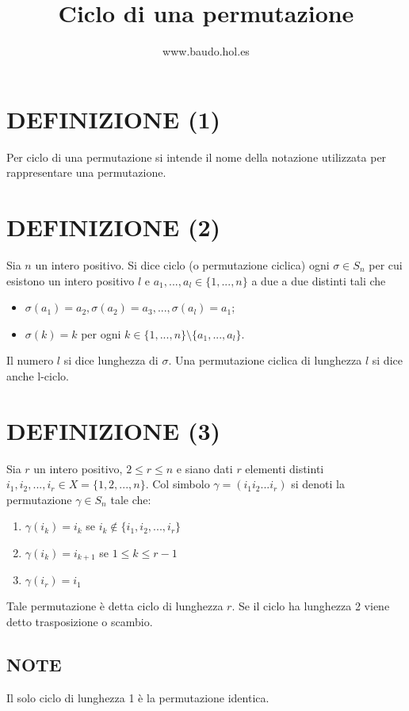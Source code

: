 \documentclass[a4paper,10pt]{article}
\title{Ciclo di una permutazione}
\author{www.baudo.hol.es}
\begin{document}
\maketitle

\section{DEFINIZIONE (1)}
Per ciclo di una permutazione si intende il nome della notazione utilizzata per rappresentare una permutazione.

\section{DEFINIZIONE (2)}
Sia $n$ un intero positivo. Si dice ciclo (o permutazione ciclica) ogni $\sigma \in S_n$ per cui esistono un intero
positivo $l$ e $a_1, ..., a_l \in \{1, ..., n\}$ a due a due distinti tali che
\begin{itemize}
 \item $\sigma(a_1)=a_2, \sigma(a_2)=a_3, ..., \sigma(a_l)=a_1$;
 \item $\sigma(k)=k$ per ogni $k \in \{1, ..., n\} \setminus \{a_1, ..., a_l\}$.
\end{itemize}
Il numero $l$ si dice lunghezza di $\sigma$. Una permutazione ciclica di lunghezza $l$ si dice anche l-ciclo.

\section{DEFINIZIONE (3)}
Sia $r$ un intero positivo, $2 \leq r \leq n $ e siano dati $r$ elementi distinti $i_1, i_2, ..., i_r \in X=\{1,2,...,n\}$.
Col simbolo $\gamma = (i_1 i_2 ... i_r)$ si denoti la permutazione $\gamma \in S_n$ tale che:
\begin{enumerate}
 \item $\gamma (i_k) = i_k$ se $i_k \notin \{i_1, i_2, ..., i_r\}$
 \item $\gamma(i_k)=i_{k+1}$ se $1 \leq k \leq r-1$
 \item $\gamma (i_r)=i_1$
\end{enumerate}
Tale permutazione è detta ciclo di lunghezza $r$.
Se il ciclo ha lunghezza 2 viene detto trasposizione o scambio.

\subsection{NOTE}
Il solo ciclo di lunghezza 1 è la permutazione identica.
\end{document}

